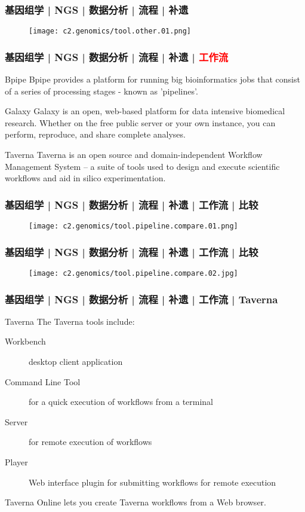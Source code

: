 \begin{frame}
  \frametitle{基因组学 | NGS | 数据分析 | 流程 | 补遗}
  \begin{figure}
    \centering
    \texttt{[image: c2.genomics/tool.other.01.png]}
  \end{figure}
\end{frame}

\begin{frame}
  \frametitle{基因组学 | NGS | 数据分析 | 流程 | 补遗 | \textcolor{red}{工作流}}
  \begin{block}{Bpipe}
    Bpipe provides a platform for running big bioinformatics jobs that consist of a series of processing stages - known as 'pipelines'.
  \end{block}
  \pause
  \begin{block}{Galaxy}
    Galaxy is an open, web-based platform for data intensive biomedical research. Whether on the free public server or your own instance, you can perform, reproduce, and share complete analyses.
  \end{block}
  \pause
  \begin{block}{Taverna}
    Taverna is an open source and domain-independent Workflow Management System – a suite of tools used to design and execute scientific workflows and aid in silico experimentation.
  \end{block}
\end{frame}

\begin{frame}
  \frametitle{基因组学 | NGS | 数据分析 | 流程 | 补遗 | 工作流 | 比较}
  \begin{figure}
    \centering
    \texttt{[image: c2.genomics/tool.pipeline.compare.01.png]}
  \end{figure}
\end{frame}

\begin{frame}
  \frametitle{基因组学 | NGS | 数据分析 | 流程 | 补遗 | 工作流 | 比较}
  \begin{figure}
    \centering
    \texttt{[image: c2.genomics/tool.pipeline.compare.02.jpg]}
  \end{figure}
\end{frame}

\begin{frame}
  \frametitle{基因组学 | NGS | 数据分析 | 流程 | 补遗 | 工作流 | Taverna}
  \begin{block}{Taverna}
    The Taverna tools include:
    \begin{description}
      \item[Workbench] desktop client application
      \item[Command Line Tool] for a quick execution of workflows from a terminal
      \item[Server] for remote execution of workflows
      \item[Player] Web interface plugin for submitting workflows for remote execution
    \end{description}
    Taverna Online lets you create Taverna workflows from a Web browser.
  \end{block}
\end{frame}

